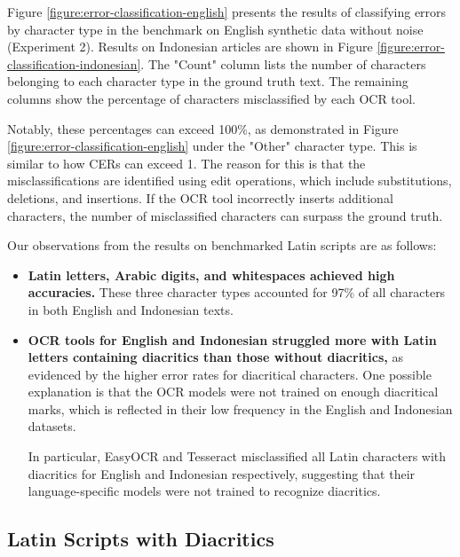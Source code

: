 \documentclass[12pt,oneside]{memoir}
\begin{document}
Figure \ref{figure:error-classification-english} presents the results of classifying errors by character type in the benchmark on English synthetic data without noise (Experiment 2). 
Results on Indonesian articles are shown in Figure \ref{figure:error-classification-indonesian}.
The "Count" column lists the number of characters belonging to each character type in the ground truth text.
The remaining columns show the percentage of characters misclassified by each OCR tool.

Notably, these percentages can exceed 100\%, as demonstrated in Figure \ref{figure:error-classification-english} under the "Other" character type.
This is similar to how CERs can exceed 1.
The reason for this is that the misclassifications are identified using edit operations, which include substitutions, deletions, and insertions. 
If the OCR tool incorrectly inserts additional characters, the number of misclassified characters can surpass the ground truth.

Our observations from the results on benchmarked Latin scripts are as follows:

\begin{itemize}
    \item \textbf{Latin letters, Arabic digits, and whitespaces achieved high accuracies.} These three character types accounted for 97\% of all characters in both English and Indonesian texts.
    \item \textbf{OCR tools for English and Indonesian struggled more with Latin letters containing diacritics than those without diacritics,} as evidenced by the higher error rates for diacritical characters.
    One possible explanation is that the OCR models were not trained on enough diacritical marks, which is reflected in their low frequency in the English and Indonesian datasets.

    In particular, EasyOCR and Tesseract misclassified all Latin characters with diacritics for English and Indonesian respectively, suggesting that their language-specific models were not trained to recognize diacritics.
\end{itemize}

\subsection{Latin Scripts with Diacritics}
\end{document}
